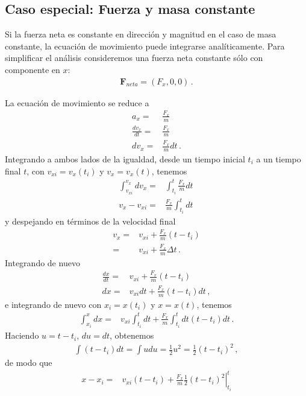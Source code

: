 \subsection{Caso especial: Fuerza y masa constante}

Si la fuerza neta es constante en dirección y magnitud en el caso de masa constante, la ecuación de movimiento puede integrarse analíticamente. Para simplificar el análisis consideremos una fuerza neta constante sólo con componente en $x$:
\begin{align}
  \mathbf{F}_{neta}=(F_x,0,0)\,.
\end{align}

La ecuación de movimiento se reduce a
\begin{align}
  a_x=&\frac{F_x}{m}\nonumber\\
\frac{dv_x}{dt}=&\frac{F_x}{m}\nonumber\\
{dv_x}=&\frac{F_x}{m}{dt}\,.
\end{align}
Integrando a ambos lados de la igualdad, desde un tiempo inicial $t_i$ a un tiempo final $t$, con $v_{xi}=v_x(t_i)$ y $v_x=v_x(t)$, tenemos
\begin{align}
  \int_{v_{xi}}^{v_x} d v_x =&\int_{t_i}^t \frac{F_x}{m}{dt}\nonumber\\
  v_x-v_{xi} =&\frac{F_x}{m}\int_{t_i}^t {dt}\,
\end{align}
y despejando en términos de la velocidad final
\begin{align}
  \label{eq:36}
  v_x =&v_{xi}+\frac{F_x}{m}(t-t_i)\nonumber\\
=&v_{xi}+\frac{F_x}{m}\Delta t\,.
\end{align}
Integrando de nuevo
\begin{align}
  \frac{dx}{dt} =&v_{xi}+\frac{F_x}{m}(t-t_i)\nonumber\\
  {dx} =&v_{xi}{dt}+\frac{F_x}{m}(t-t_i){dt}\,,
\end{align}
e integrando de nuevo con $x_i=x(t_i)$ y $x=x(t)$, tenemos
\begin{align}
  \int_{x_i}^{x}{dx} =&v_{xi}\int_{t_i}^t{dt}+\frac{F_x}{m}\int_{t_i}^t{dt}(t-t_i){dt}\,.
\end{align}
Haciendo $u=t-t_i$, $du=dt$, obtenemos
\begin{align}
\int(t-t_i)dt=\int u du=\frac{1}{2}u^2=\frac{1}{2}(t-t_i)^2\,,
\end{align}
de modo que
\begin{align}
  x-x_i=&v_{xi}(t-t_i)+\frac{F_x}{m}\left.\frac{1}{2}(t-t_i)^2\right|^t_{t_i}
\end{align}
